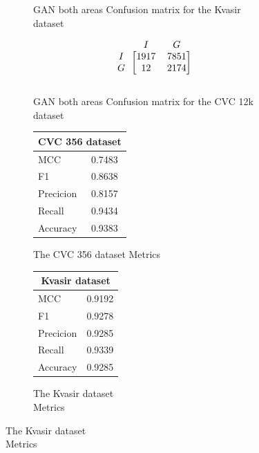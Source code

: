 \begin{figure}
\begin{subfigure}[b]{0.49\textwidth}
        
\caption{GAN both areas Confusion matrix for the Kvasir dataset}
\label{mat:kvasir_CM_DN121_GAN_BOTH}
\end{subfigure}
\begin{subfigure}[b]{0.25\textwidth}
        \[
\begin{blockarray}{ccc}
& I & G  \\
\begin{block}{c[cc]}
 		I&1917 & 7851\\
        G&  12 & 2174\\
\end{block}
\end{blockarray}
\]   
\caption{GAN both areas Confusion matrix for the CVC 12k dataset}
\label{mat:cvc12k_CM_DN121_GAN_BOTH}
\end{subfigure}
\caption{Confusion matrices for the three datasets}
\label{mat:CM_DN121_GAN_BOTH}
\begin{subfigure}[b]{0.25\textwidth}
\begin{tabular}{ll}      
        \toprule
        \multicolumn{2}{c}{CVC 356 dataset}        \\
        \midrule
        MCC 		& 0.7483 \\
        F1  		& 0.8638 \\
        Precicion  	& 0.8157 \\
        Recall      & 0.9434 \\
        Accuracy	& 0.9383  \\         
        \bottomrule
        \end{tabular}
\caption{The CVC 356 dataset Metrics}
\label{tab:cvc356_metrics_DN121_GAN_BOTH}
\end{subfigure}%
\begin{subfigure}[b]{0.49\textwidth}
    	\centering
        \begin{tabular}{ll}
        \toprule
        \multicolumn{2}{c}{Kvasir dataset}        \\
        \midrule
        MCC 		& 0.9192 \\
        F1  		& 0.9278  \\
        Precicion  	& 0.9285 \\
        Recall     	& 0.9339 \\
        Accuracy	& 0.9285 \\
        \bottomrule
\end{tabular}
\caption{The Kvasir dataset\\ Metrics}
\label{tab:kvasir_metrics_DN121_GAN_BOTH}
\end{subfigure}%

\end{figure}
